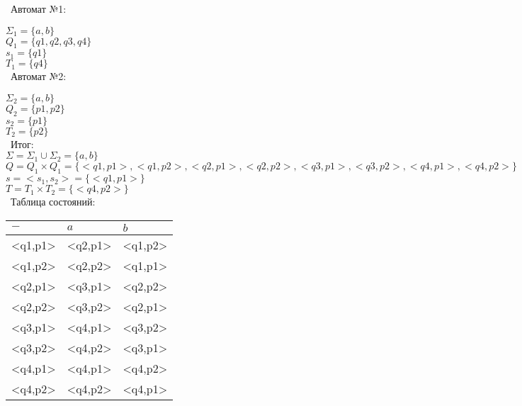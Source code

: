 \documentclass{article}
\begin{document}
\begin{enumerate}
\ Автомат №1: \\


$ \Sigma_{1} = \{ a, b \}$ \\
$ Q_{1} = \{ q1, q2, q3, q4 \} $ \\
$ s_{1} = \{ q1 \} $ \\
$ T_{1} = \{ q4 \}$ \\

\ Автомат №2: \\


$ \Sigma_{2} = \{ a, b \}$ \\
$ Q_{2} = \{ p1, p2 \} $ \\
$ s_{2} = \{ p1 \} $ \\
$ T_{2} = \{ p2 \}$ \\

\ Итог: \\

$ \Sigma = \Sigma_{1} \cup \Sigma_{2} = \{ a, b \}$ \\
$ Q = Q_{1} \times Q_{1} = \{ <q1,p1>, <q1,p2>, <q2,p1>, <q2,p2>, <q3,p1>, <q3,p2>, <q4,p1>, <q4,p2> \}$ \\
$ s = <s_{1}, s_{2}> = \{ <q1,p1> \}$ \\
$ T = T_{1} \times T_{2} = \{ <q4,p2> \}$ \\

\ Таблица состояний: \\

\begin{table}[!htbp]


\begin{tabular}{|l|l|l|}

\hline

  $-$     &   $a$    &   $b$   \\ \hline
<q1,p1>   & <q2,p1>  & <q1,p2>  \\ \hline
<q1,p2>   & <q2,p2>  & <q1,p1>  \\ \hline
<q2,p1>   & <q3,p1>  & <q2,p2>  \\ \hline
<q2,p2>   & <q3,p2>  & <q2,p1>  \\ \hline
<q3,p1>   & <q4,p1>  & <q3,p2>  \\ \hline
<q3,p2>   & <q4,p2>  & <q3,p1>  \\ \hline
<q4,p1>   & <q4,p1>  & <q4,p2>  \\ \hline
<q4,p2>   & <q4,p2>  & <q4,p1>  \\ \hline


\end{tabular}
\end{table}
\end{enumerate}
\end{document}

